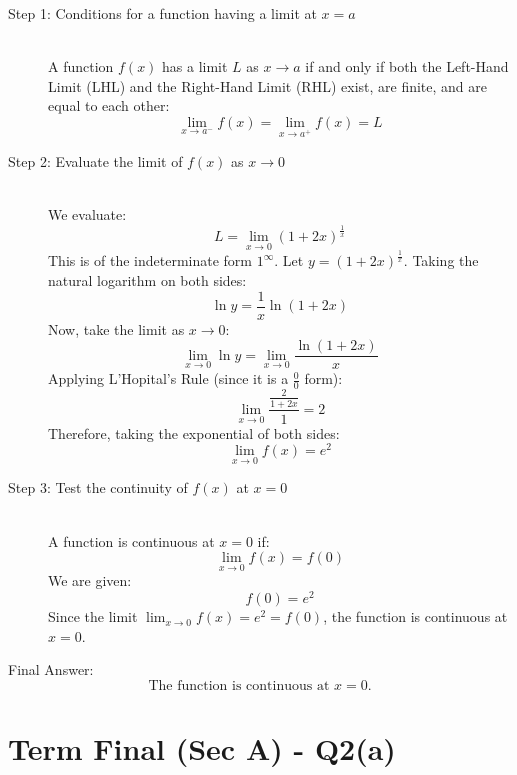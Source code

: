 \documentclass[11pt, a4paper]{article}
\begin{document}
\begin{description}
    \item[Step 1: Conditions for a function having a limit at $x=a$] \ \\
    A function $f(x)$ has a limit $L$ as $x \to a$ if and only if both the Left-Hand Limit (LHL) and the Right-Hand Limit (RHL) exist, are finite, and are equal to each other:
    \[ \lim_{x \to a^-} f(x) = \lim_{x \to a^+} f(x) = L \]

    \item[Step 2: Evaluate the limit of $f(x)$ as $x \to 0$] \ \\
    We evaluate:
    \[ L = \lim_{x \to 0} (1+2x)^{\frac{1}{x}} \]
    This is of the indeterminate form $1^{\infty}$. Let $y = (1+2x)^{\frac{1}{x}}$.
    Taking the natural logarithm on both sides:
    \[ \ln y = \frac{1}{x} \ln(1+2x) \]
    Now, take the limit as $x \to 0$:
    \[ \lim_{x \to 0} \ln y = \lim_{x \to 0} \frac{\ln(1+2x)}{x} \]
    Applying L'Hopital's Rule (since it is a $\frac{0}{0}$ form):
    \[ \lim_{x \to 0} \frac{\frac{2}{1+2x}}{1} = 2 \]
    Therefore, taking the exponential of both sides:
    \[ \lim_{x \to 0} f(x) = e^2 \]

    \item[Step 3: Test the continuity of $f(x)$ at $x=0$] \ \\
    A function is continuous at $x=0$ if:
    \[ \lim_{x \to 0} f(x) = f(0) \]
    We are given:
    \[ f(0) = e^2 \]
    Since the limit $\lim_{x \to 0} f(x) = e^2 = f(0)$, the function is continuous at $x=0$.
\end{description}

Final Answer:
\[ 
\boxed{\text{The function is continuous at } x=0.} 
\]



\section*{Term Final (Sec A) - Q2(a)}
\end{document}
